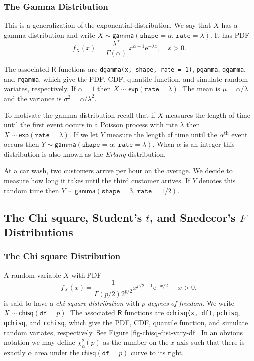 \subsubsection{The Gamma Distribution}
\label{sec-6-5-1-2}

This is a generalization of the exponential distribution. We say that
\(X\) has a gamma distribution and write
\(X\sim\mathsf{gamma}(\mathtt{shape}=\alpha,\,\mathtt{rate}=\lambda)\). It
has PDF
\begin{equation}
f_{X}(x)=\frac{\lambda^{\alpha}}{\Gamma(\alpha)}\: x^{\alpha-1}\mathrm{e}^{-\lambda x},\quad x>0.
\end{equation}

The associated \(\mathsf{R}\) functions are \texttt{dgamma(x, shape, rate =
1)}, \texttt{pgamma}, \texttt{qgamma}, and \texttt{rgamma}, which give the PDF, CDF,
quantile function, and simulate random variates, respectively. If
\(\alpha=1\) then \(X\sim\mathsf{exp}(\mathtt{rate}=\lambda)\). The
mean is \(\mu=\alpha/\lambda\) and the variance is
\(\sigma^{2}=\alpha/\lambda^{2}\).

To motivate the gamma distribution recall that if \(X\) measures the
length of time until the first event occurs in a Poisson process with
rate \(\lambda\) then \(X\sim\mathsf{exp}(\mathtt{rate}=\lambda)\). If
we let \(Y\) measure the length of time until the
\(\alpha^{\mathrm{th}}\) event occurs then
\(Y\sim\mathsf{gamma}(\mathtt{shape}=\alpha,\,\mathtt{rate}=\lambda)\). When
\(\alpha\) is an integer this distribution is also known as the
\emph{Erlang} distribution.


At a car wash, two customers arrive per hour on the average. We decide
to measure how long it takes until the third customer arrives. If
\(Y\) denotes this random time then
\(Y\sim\mathsf{gamma}(\mathtt{shape}=3,\,\mathtt{rate}=1/2)\).

\subsection{The Chi square, Student's \(t\), and Snedecor's \(F\) Distributions}
\label{sec-6-5-2}

\subsubsection{The Chi square Distribution}
\label{sec-6-5-2-1}

A random variable \(X\) with PDF
\begin{equation}
f_{X}(x)=\frac{1}{\Gamma(p/2)2^{p/2}}x^{p/2-1}\mathrm{e}^{-x/2},\quad x>0,
\end{equation}
is said to have a \emph{chi-square distribution} with \(p\) \emph{degrees of
freedom}. We write \(X\sim\mathsf{chisq}(\mathtt{df}=p)\). The
associated \(\mathsf{R}\) functions are \texttt{dchisq(x, df)}, \texttt{pchisq},
\texttt{qchisq}, and \texttt{rchisq}, which give the PDF, CDF, quantile function,
and simulate random variates, respectively. See Figure
\ref{fig-chisq-dist-vary-df}. In an obvious notation we may define
\(\chi_{\alpha}^{2}(p)\) as the number on the \(x\)-axis such that
there is exactly \(\alpha\) area under the
\(\mathsf{chisq}(\mathtt{df}=p)\) curve to its right.

